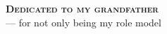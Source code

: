
\thispagestyle{empty}

\vspace*{7cm}
\begin{flushright}
    \textbf{\Large \textsc{Dedicated to my grandfather}} \\[24pt]
        --- for not only being my role model%
\end{flushright}